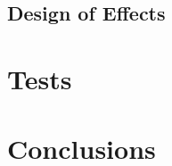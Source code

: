 \chapter{Design of Effects}



\part{Tests}\label{pt:tests} 
\part{Conclusions}\label{pt:conclusions} 
%

\glsresetall
\appendix %

 \graphicspath{{figures/appendix/}}



